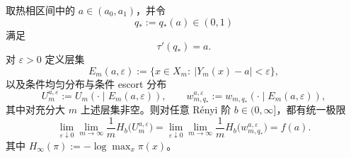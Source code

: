 \begin{theorem}\label{thm:pom-microcanonical-escort-all-renyi-collapse}
取热相区间中的 \(a\in(a_0,a_1)\)，并令
\[
q_*:=q_*(a)\in(0,1)
\]
满足
\[
\tau'(q_*)=a.
\]
对 \(\varepsilon>0\) 定义层集
\[
E_m(a,\varepsilon):=\{x\in X_m:\ |Y_m(x)-a|<\varepsilon\},
\]
以及条件均匀分布与条件 escort 分布
\[
U_m^{a,\varepsilon}:=U_m(\cdot\mid E_m(a,\varepsilon)),
\qquad
w_{m,q_*}^{a,\varepsilon}:=w_{m,q_*}(\cdot\mid E_m(a,\varepsilon)),
\]
其中对充分大 \(m\) 上述层集非空。则对任意 Rényi 阶 \(b\in(0,\infty]\)，都有统一极限
\[
\boxed{\;
\lim_{\varepsilon\downarrow 0}\lim_{m\to\infty}\frac{1}{m}H_b\!\bigl(U_m^{a,\varepsilon}\bigr)
=
\lim_{\varepsilon\downarrow 0}\lim_{m\to\infty}\frac{1}{m}H_b\!\bigl(w_{m,q_*}^{a,\varepsilon}\bigr)
=
f(a).\;}
\]
其中 \(H_\infty(\pi):=-\log\max_x\pi(x)\)。
\end{theorem}
